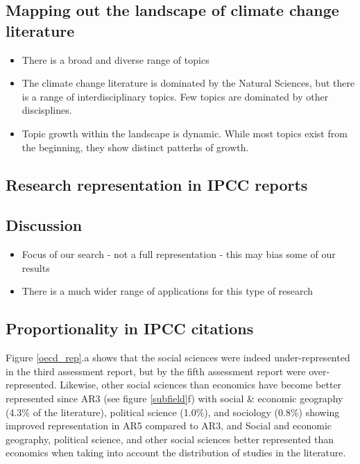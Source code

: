 \documentclass{article}
\begin{document}
\begin{linenumbers}
		
		\subsection{Mapping out the landscape of climate change literature}
		
		\begin{itemize}
			\item There is a broad and diverse range of topics
			\item The climate change literature is dominated by the Natural Sciences, but there is a range of interdisciplinary topics. Few topics are dominated by other discisplines.
			\item Topic growth within the landscape is dynamic. While most topics exist from the beginning, they show distinct patterhs of growth.
		\end{itemize}
		
		\subsection{Research representation in IPCC reports}
		
		\subsection{Discussion}
		
		\begin{itemize}
			\item Focus of our search - not a full representation - this may bias some of our results
			\item There is a much wider range of applications for this type of research
		\end{itemize}
		
		
		\subsection*{Proportionality in IPCC citations}
		
		
		Figure \ref{oecd_rep}.a shows that the social sciences were indeed under-represented in the third assessment report, but by the fifth assessment report were over-represented. Likewise, other social sciences than economics have become better represented since AR3  (see figure \ref{subfield}f) with social \& economic geography (4.3\% of the literature), political science (1.0\%), and sociology (0.8\%) showing improved representation in AR5 compared to AR3, and Social and economic geography, political science, and other social sciences better represented than economics when taking into account the distribution of studies in the literature. 
		

\end{linenumbers}
\end{document}
